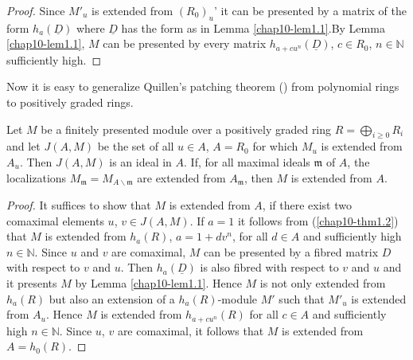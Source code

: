 \begin{proof}
Since $M'_{u}$ is extended from $(R_{0})_{u}$' it can be presented by
a matrix of the form $h_{a}(\underline{D})$ where $\underline{D}$ has
the form as in Lemma \ref{chap10-lem1.1}.\pageoriginale By
Lemma \ref{chap10-lem1.1}, $M$ can be presented by every matrix
$h_{a+cu^{n}}(\underline{D})$, $c\in R_{0}$, $n\in \mathbb{N}$
sufficiently high. 
\end{proof}

Now it is easy to generalize Quillen's patching theorem (\cite[Theorem
1]{chap10-Qu}) from polynomial rings to positively graded rings.

\begin{subthm}\label{chap10-thm1.3}
Let $M$ be a finitely presented module over a positively graded ring
$R=\bigoplus\limits_{i\geq 0}R_{i}$ and let $J(A,M)$ be the set of all
$u\in A$, $A=R_{0}$ for which $M_{u}$ is extended from $A_{u}$. Then
$J(A,M)$ is an ideal in $A$. If, for all maximal ideals $\mathfrak{m}$
of $A$, the localizations
$M_{\mathfrak{m}}=M_{A\backslash \mathfrak{m}}$ are extended from
$A_{\mathfrak{m}}$, then $M$ is extended from $A$. 
\end{subthm}

\begin{proof}
It suffices to show that $M$ is extended from $A$, if there exist two
comaximal elements $u$, $v\in J(A,M)$. If $a=1$ it follows from
(\ref{chap10-thm1.2}) that $M$ is extended from $h_{a}(R)$,
$a=1+dv^{n}$, for all $d\in A$ and sufficiently high
$n\in \mathbb{N}$. Since $u$ and $v$ are comaximal, $M$ can be
presented by a fibred matrix $D$ with respect to $v$ and $u$. Then
$h_{a}(\underline{D})$ is also fibred with respect to $v$ and $u$ and
it presents $M$ by Lemma \ref{chap10-lem1.1}. Hence $M$ is not only
extended from $h_{a}(R)$ but also an extension of a $h_{a}(R)$-module
$M'$ such that $M'_{u}$ is extended from $A_{u}$. Hence $M$ is
extended from $h_{a+cu^{n}}(R)$ for all $c\in A$ and sufficiently high
$n\in \mathbb{N}$. Since $u$, $v$ are comaximal, it follows that $M$
is extended from $A=h_{0}(R)$. 
\end{proof}

\setcounter{subsection}{3}
